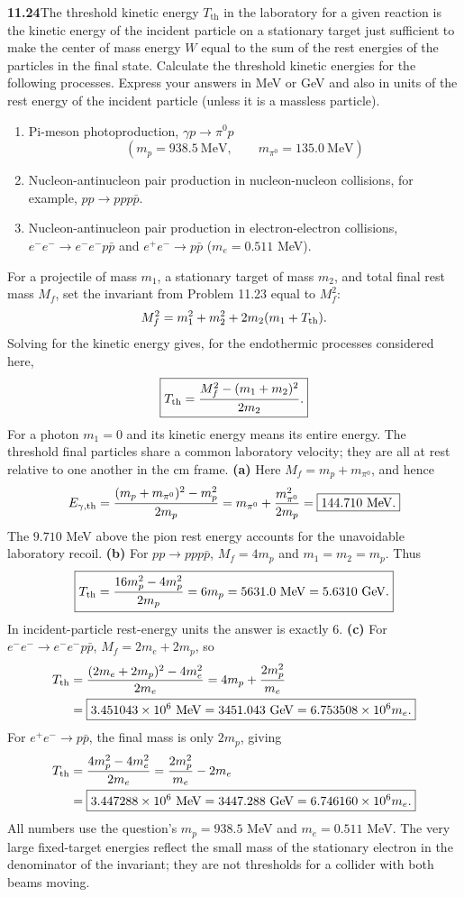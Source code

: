 \par\bigskip
\noindent\textbf{11.24}\quad The threshold kinetic energy $T_{\mathrm{th}}$ in the laboratory for a given reaction is the kinetic energy of the incident particle on a stationary target just sufficient to make the center of mass energy $W$ equal to the sum of the rest energies of the particles in the final state. Calculate the threshold kinetic energies for the following processes. Express your answers in MeV or GeV and also in units of the rest energy of the incident particle (unless it is a massless particle).
\begin{enumerate}
\item[(a)] Pi-meson photoproduction, $\gamma p\to\pi^{0}p$
\[
(m_{p}=938.5\ \mathrm{MeV},\qquad m_{\pi^{0}}=135.0\ \mathrm{MeV})
\]
\item[(b)] Nucleon-antinucleon pair production in nucleon-nucleon collisions, for example, $pp\to ppp\bar{p}$.
\item[(c)] Nucleon-antinucleon pair production in electron-electron collisions, $e^{-}e^{-}\to e^{-}e^{-}p\bar{p}$ and $e^{+}e^{-}\to p\bar{p}$ ($m_{e}=0.511$ MeV).
\end{enumerate}
\solution
For a projectile of mass $m_1$, a stationary target of mass
$m_2$, and total final rest mass $M_f$, set the invariant from
Problem 11.23 equal to $M_f^2$:
\[
M_f^2=m_1^2+m_2^2+2m_2(m_1+T_{\rm th}).
\]
Solving for the kinetic energy gives, for the endothermic
processes considered here,
\[
\boxed{T_{\rm th}=\frac{M_f^2-(m_1+m_2)^2}{2m_2}.}
\]
For a photon $m_1=0$ and its kinetic energy means its entire energy.
The threshold final particles share a common laboratory velocity;
they are all at rest relative to one another in the cm frame.
\textbf{(a)} Here $M_f=m_p+m_{\pi^0}$, and hence
\[
E_{\gamma,\rm th}
=\frac{(m_p+m_{\pi^0})^2-m_p^2}{2m_p}
=m_{\pi^0}+\frac{m_{\pi^0}^2}{2m_p}
=\boxed{144.710\ \mathrm{MeV}.}
\]
The $9.710$ MeV above the pion rest energy accounts for the
unavoidable laboratory recoil.
\textbf{(b)} For $pp\to ppp\bar p$, $M_f=4m_p$ and
$m_1=m_2=m_p$. Thus
\[
\boxed{T_{\rm th}=\frac{16m_p^2-4m_p^2}{2m_p}
=6m_p=5631.0\ \mathrm{MeV}=5.6310\ \mathrm{GeV}.}
\]
In incident-particle rest-energy units the answer is exactly $6$.
\textbf{(c)} For $e^-e^-\to e^-e^-p\bar p$,
$M_f=2m_e+2m_p$, so
\begin{align*}
T_{\rm th}&=\frac{(2m_e+2m_p)^2-4m_e^2}{2m_e}
=4m_p+\frac{2m_p^2}{m_e}\\
&=\boxed{3.451043\times10^6\ \mathrm{MeV}
=3451.043\ \mathrm{GeV}=6.753508\times10^6m_e.}
\end{align*}
For $e^+e^-\to p\bar p$, the final mass is only $2m_p$, giving
\begin{align*}
T_{\rm th}&=\frac{4m_p^2-4m_e^2}{2m_e}
=\frac{2m_p^2}{m_e}-2m_e\\
&=\boxed{3.447288\times10^6\ \mathrm{MeV}
=3447.288\ \mathrm{GeV}=6.746160\times10^6m_e.}
\end{align*}
All numbers use the question's $m_p=938.5$ MeV and $m_e=0.511$
MeV. The very large fixed-target energies reflect the small mass
of the stationary electron in the denominator of the invariant;
they are not thresholds for a collider with both beams moving.

